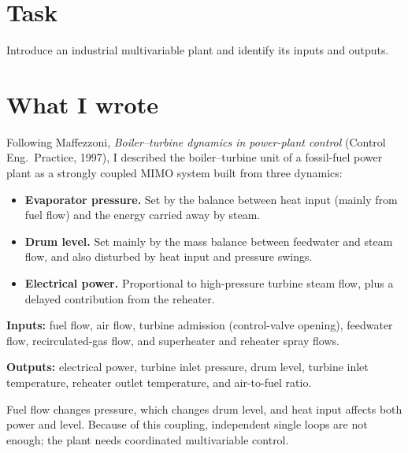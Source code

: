


\section*{Task}
Introduce an industrial multivariable plant and identify its inputs and outputs.

\section*{What I wrote}
Following Maffezzoni, \emph{Boiler--turbine dynamics in power-plant control} (Control Eng.\ Practice, 1997), I described the boiler--turbine unit of a fossil-fuel power plant as a strongly coupled MIMO system built from three dynamics:
\begin{itemize}
  \item \textbf{Evaporator pressure.} Set by the balance between heat input (mainly from fuel flow) and the energy carried away by steam.
  \item \textbf{Drum level.} Set mainly by the mass balance between feedwater and steam flow, and also disturbed by heat input and pressure swings.
  \item \textbf{Electrical power.} Proportional to high-pressure turbine steam flow, plus a delayed contribution from the reheater.
\end{itemize}
\textbf{Inputs:} fuel flow, air flow, turbine admission (control-valve opening), feedwater flow, recirculated-gas flow, and superheater and reheater spray flows.

\textbf{Outputs:} electrical power, turbine inlet pressure, drum level, turbine inlet temperature, reheater outlet temperature, and air-to-fuel ratio.

Fuel flow changes pressure, which changes drum level, and heat input affects both power and level. Because of this coupling, independent single loops are not enough; the plant needs coordinated multivariable control.

